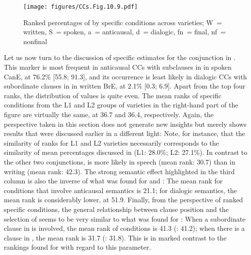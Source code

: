 \begin{figure}
\texttt{[image: figures/CCs.Fig.10.9.pdf]}
\caption{\label{bkm:Ref60241698}\label{fig:10.9}Ranked percentages of  by specific conditions across varieties; W~= written, S~= spoken, a~= anticausal, d~= dialogic, fn~= final, nf~= nonfinal}
\end{figure}

Let us now turn to the discussion of specific estimates for the conjunction  in . This marker is most frequent in anticausal CCs with subclauses in  in spoken CanE, at 76.2\% [55.8; 91.3], and its occurrence is least likely in dialogic CCs with subordinate clauses in  in written BrE, at 2.1\% [0.3; 6.9]. Apart from the top four ranks, the distribution of values is quite even. The mean ranks of specific conditions from the L1 and L2 groups of varieties in the right-hand part of the figure are virtually the same, at 36.7 and 36.4, respectively. Again, the perspective taken in this section does not generate new insights but merely shows results that were discussed earlier in a different light: Note, for instance, that the similarity of ranks for L1 and L2 varieties necessarily corresponds to the similarity of mean percentages discussed in  (L1: 28.0\%; L2: 27.1\%). In contrast to the other two conjunctions,  is more likely in speech (mean rank: 30.7) than in writing (mean rank: 42.3). The strong semantic effect highlighted in the third column is also the inverse of what was found for  and : The mean rank for conditions that involve anticausal semantics is 21.1; for dialogic semantics, the mean rank is considerably lower, at 51.9. Finally, from the perspective of ranked specific conditions, the general relationship between clause position and the selection of  seems to be very similar to what was found for : When a subordinate clause in  is involved, the mean rank of conditions is 41.3 (: 41.2); when there is a clause in , the mean rank is 31.7 (: 31.8). This is in marked contrast to the rankings found for  with regard to this parameter.

